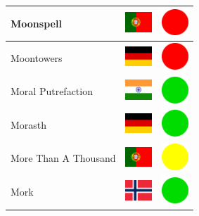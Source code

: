\documentclass[12pt, a4paper, twoside]{report}
\begin{document}
\begin{center}
\begin{longtable}{|p{5cm}|p{2cm}|p{2cm}|}
Moonspell & \includegraphics[width=1cm]{4x3/pt} & \includegraphics[width=1cm]{likes/n} \\ \hline
Moontowers & \includegraphics[width=1cm]{4x3/de} & \includegraphics[width=1cm]{likes/n} \\ \hline
Moral Putrefaction & \includegraphics[width=1cm]{4x3/in} & \includegraphics[width=1cm]{likes/y} \\ \hline
Morasth & \includegraphics[width=1cm]{4x3/de} & \includegraphics[width=1cm]{likes/y} \\ \hline
More Than A Thousand & \includegraphics[width=1cm]{4x3/pt} & \includegraphics[width=1cm]{likes/m} \\ \hline
Mork & \includegraphics[width=1cm]{4x3/no} & \includegraphics[width=1cm]{likes/y} \\ \hline

\end{longtable}
\end{center}
\end{document}
